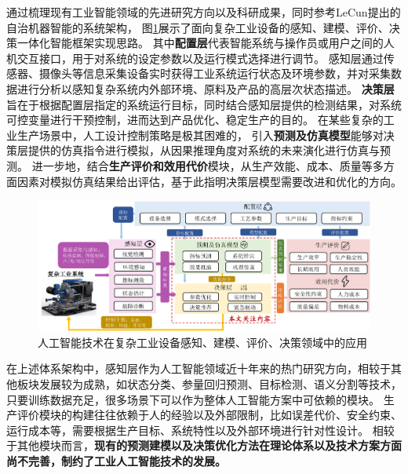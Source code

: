 通过梳理现有工业智能领域的先进研究方向以及科研成果，同时参考LeCun提出的自治机器智能的系统架构\cite{lecun2022path}，
图\ref{fig:industrial_ai}展示了面向复杂工业设备的感知、建模、评价、决策一体化智能框架实现思路。
其中\textbf{配置层}代表智能系统与操作员或用户之间的人机交互接口，用于对系统的设定参数以及运行模式选择进行调节。
感知层通过传感器、摄像头等信息采集设备实时获得工业系统运行状态及环境参数，并对采集数据进行分析以感知复杂系统内外部环境、原料及产品的高层次状态描述。
\textbf{决策层}旨在于根据配置层指定的系统运行目标，同时结合感知层提供的检测结果，对系统可控变量进行干预控制，进而达到产品优化、稳定生产的目的。
在某些复杂的工业生产场景中，人工设计控制策略是极其困难的，
引入\textbf{预测及仿真模型}能够对决策层提供的仿真指令进行模拟，从因果推理角度对系统的未来演化进行仿真与预测。
进一步地，结合\textbf{生产评价和效用代价}模块，从生产效能、成本、质量等多方面因素对模拟仿真结果给出评估，基于此指明决策层模型需要改进和优化的方向。

\begin{figure}
    \includegraphics[width=\linewidth]{figures/chapter1/industrial_ai.pdf}
    \caption{
        人工智能技术在复杂工业设备感知、建模、评价、决策领域中的应用}
    \label{fig:industrial_ai}
\end{figure}

在上述体系架构中，感知层作为人工智能领域近十年来的热门研究方向，相较于其他板块发展较为成熟，如状态分类、参量回归预测、目标检测、语义分割等技术，只要训练数据充足，很多场景下可以作为整体人工智能方案中可依赖的模块。
生产评价模块的构建往往依赖于人的经验以及外部限制，比如误差代价、安全约束、运行成本等，需要根据生产目标、系统特性以及外部环境进行针对性设计。
相较于其他模块而言，\textbf{现有的预测建模以及决策优化方法在理论体系以及技术方案方面尚不完善，制约了工业人工智能技术的发展。}

